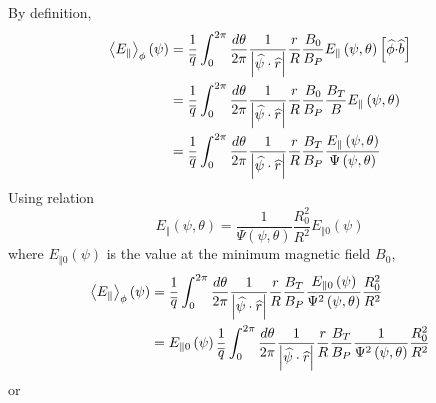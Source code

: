 \documentclass[12pt,a4paper]{article}
\begin{document}
By definition, 
\begin{align}
\left\langle E_{\Vert }\right\rangle _{\phi }\left( \psi \right) & =\frac{1}{%
\overline{q}}\int_{0}^{2\pi }\frac{d\theta }{2\pi }\frac{1}{\left\vert 
\widehat{\psi }\cdot \widehat{r}\right\vert }\frac{r}{R}\frac{B_{0}}{B_{P}}%
E_{\Vert }\left( \psi ,\theta \right) \left[ \widehat{\phi }\mathbf{\cdot }%
\widehat{b}\right]   \nonumber \\
& =\frac{1}{\overline{q}}\int_{0}^{2\pi }\frac{d\theta }{2\pi }\frac{1}{%
\left\vert \widehat{\psi }\cdot \widehat{r}\right\vert }\frac{r}{R}\frac{%
B_{0}}{B_{P}}\frac{B_{T}}{B}E_{\Vert }\left( \psi ,\theta \right)   \nonumber
\\
& =\frac{1}{\overline{q}}\int_{0}^{2\pi }\frac{d\theta }{2\pi }\frac{1}{%
\left\vert \widehat{\psi }\cdot \widehat{r}\right\vert }\frac{r}{R}\frac{%
B_{T}}{B_{P}}\frac{E_{\Vert }\left( \psi ,\theta \right) }{\Psi \left( \psi
,\theta \right) }
\end{align}%
Using relation 
\begin{equation}
E_{\Vert }\left( \psi ,\theta \right) =\frac{1}{\Psi \left( \psi ,\theta
\right) }\frac{R_{0}^{2}}{R^{2}}E_{\Vert 0}\left( \psi \right) 
\end{equation}%
where $E_{\Vert 0}\left( \psi \right) $ is the value at the minimum magnetic
field $B_{0}$, 
\begin{align}
\left\langle E_{\Vert }\right\rangle _{\phi }\left( \psi \right) & =\frac{1}{%
\overline{q}}\int_{0}^{2\pi }\frac{d\theta }{2\pi }\frac{1}{\left\vert 
\widehat{\psi }\cdot \widehat{r}\right\vert }\frac{r}{R}\frac{B_{T}}{B_{P}}%
\frac{E_{\Vert 0}\left( \psi \right) }{\Psi ^{2}\left( \psi ,\theta \right) }%
\frac{R_{0}^{2}}{R^{2}}  \nonumber \\
& =E_{\Vert 0}\left( \psi \right) \frac{1}{\overline{q}}\int_{0}^{2\pi }%
\frac{d\theta }{2\pi }\frac{1}{\left\vert \widehat{\psi }\cdot \widehat{r}%
\right\vert }\frac{r}{R}\frac{B_{T}}{B_{P}}\frac{1}{\Psi ^{2}\left( \psi
,\theta \right) }\frac{R_{0}^{2}}{R^{2}}
\end{align}%
or 
\end{document}
